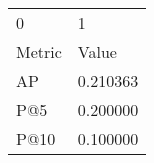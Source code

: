 \begin{tabular}{ll}
0 & 1 \\
Metric & Value \\
AP & 0.210363 \\
P@5 & 0.200000 \\
P@10 & 0.100000 \\
\end{tabular}
